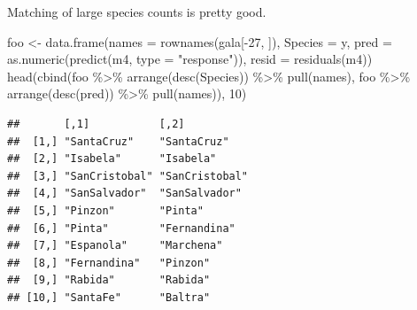 \documentclass[
  ignorenonframetext,
]{beamer}
\newenvironment{Shaded}{\begin{snugshade}}{\end{snugshade}}
\newcommand{\AttributeTok}[1]{\textcolor[rgb]{0.77,0.63,0.00}{#1}}
\newcommand{\DecValTok}[1]{\textcolor[rgb]{0.00,0.00,0.81}{#1}}
\newcommand{\FunctionTok}[1]{\textcolor[rgb]{0.00,0.00,0.00}{#1}}
\newcommand{\NormalTok}[1]{#1}
\newcommand{\OtherTok}[1]{\textcolor[rgb]{0.56,0.35,0.01}{#1}}
\newcommand{\SpecialCharTok}[1]{\textcolor[rgb]{0.00,0.00,0.00}{#1}}
\newcommand{\StringTok}[1]{\textcolor[rgb]{0.31,0.60,0.02}{#1}}
\begin{document}
\begin{frame}[fragile]{}
\protect\hypertarget{section-17}{}
Matching of large species counts is pretty good.

\vspace{12pt}
\tiny

\begin{Shaded}
\begin{Highlighting}[]
\NormalTok{foo }\OtherTok{\textless{}{-}} \FunctionTok{data.frame}\NormalTok{(}\AttributeTok{names =} \FunctionTok{rownames}\NormalTok{(gala[}\SpecialCharTok{{-}}\DecValTok{27}\NormalTok{, ]),}
                  \AttributeTok{Species =}\NormalTok{ y,}
                  \AttributeTok{pred =} \FunctionTok{as.numeric}\NormalTok{(}\FunctionTok{predict}\NormalTok{(m4, }\AttributeTok{type =} \StringTok{"response"}\NormalTok{)), }
                  \AttributeTok{resid =} \FunctionTok{residuals}\NormalTok{(m4))}
\FunctionTok{head}\NormalTok{(}\FunctionTok{cbind}\NormalTok{(foo }\SpecialCharTok{\%\textgreater{}\%} \FunctionTok{arrange}\NormalTok{(}\FunctionTok{desc}\NormalTok{(Species)) }\SpecialCharTok{\%\textgreater{}\%} \FunctionTok{pull}\NormalTok{(names),}
\NormalTok{           foo }\SpecialCharTok{\%\textgreater{}\%} \FunctionTok{arrange}\NormalTok{(}\FunctionTok{desc}\NormalTok{(pred)) }\SpecialCharTok{\%\textgreater{}\%} \FunctionTok{pull}\NormalTok{(names)), }\DecValTok{10}\NormalTok{)}
\end{Highlighting}
\end{Shaded}

\begin{verbatim}
##       [,1]           [,2]          
##  [1,] "SantaCruz"    "SantaCruz"   
##  [2,] "Isabela"      "Isabela"     
##  [3,] "SanCristobal" "SanCristobal"
##  [4,] "SanSalvador"  "SanSalvador" 
##  [5,] "Pinzon"       "Pinta"       
##  [6,] "Pinta"        "Fernandina"  
##  [7,] "Espanola"     "Marchena"    
##  [8,] "Fernandina"   "Pinzon"      
##  [9,] "Rabida"       "Rabida"      
## [10,] "SantaFe"      "Baltra"
\end{verbatim}
\end{frame}
\end{document}
